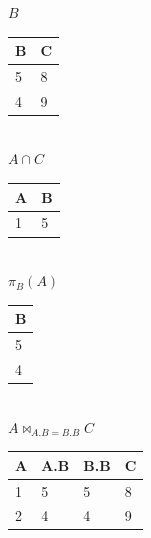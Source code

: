 \documentclass[12pt, a4paper]{article}
\begin{document}
			\begin{minipage}[t]{0.32\textwidth}
				\begin{center}
				$B$\\
				\begin{tabular}{|l|l|}
				\hline
				B & C \\ \hline
				5 & 8 \\ \hline
				4 & 9 \\ \hline
				\end{tabular}\\[4mm]
				$A\cap C$\\
				\begin{tabular}{|l|l|}
				\hline
				A & B \\ \hline
				1 & 5 \\ \hline
				\end{tabular}\\[4mm]
				$\pi_B(A)$\\
				\begin{tabular}{|l|}
				\hline
				 B \\ \hline
				 5 \\ \hline
				 4 \\ \hline
				\end{tabular}\\[4mm]
				$A\bowtie_{A.B = B.B}C$\\
				\begin{tabular}{|l|l|l|l|}
				\hline
				A & A.B & B.B & C \\ \hline
				1 & 5 & 5 & 8\\ \hline
				2 & 4 & 4 & 9\\ \hline
				\end{tabular}
				\end{center}				
			\end{minipage}
\end{document}
